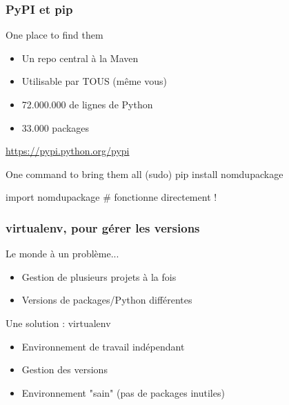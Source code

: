 \documentclass{beamer}
\begin{document}
\begin{frame}[fragile]
  \frametitle{PyPI et pip}
  \begin{block}{One place to find them}
    \begin{itemize}
    \item Un repo central à la Maven
    \item Utilisable par TOUS (même vous)
    \item 72.000.000 de lignes de Python
    \item 33.000 packages
    \end{itemize}
    \centering
    \url{https://pypi.python.org/pypi}
  \end{block}

  \pause

  \begin{block}{One command to bring them all}
    (sudo) pip install nomdupackage

    \begin{python}
import nomdupackage # fonctionne directement !
    \end{python}
  \end{block}
\end{frame}

\begin{frame}
  \frametitle{virtualenv, pour gérer les versions}

  \begin{block}{Le monde à un problème...}
    \begin{itemize}
    \item Gestion de plusieurs projets à la fois
    \item Versions de packages/Python différentes
    \end{itemize}
  \end{block}

  \pause

  \begin{block}{Une solution : virtualenv}
    \begin{itemize}
    \item Environnement de travail indépendant
    \item Gestion des versions
    \item Environnement "sain" (pas de packages inutiles)
    \end{itemize}
  \end{block}
\end{frame}
\end{document}
